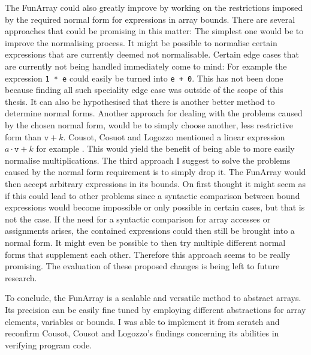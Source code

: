The FunArray could also greatly improve by working on the restrictions imposed by the required normal form for expressions in array bounds. There are several approaches that could be promising in this matter: The simplest one would be to improve the normalising process. It might be possible to normalise certain expressions that are currently deemed not normalisable. Certain edge cases that are currently not being handled immediately come to mind: For example the expression \texttt{1 * e} could easily be turned into \texttt{e + 0}. This has not been done because finding all such speciality edge case was outside of the scope of this thesis. It can also be hypothesised that there is another better method to determine normal forms. Another approach for dealing with the problems caused by the chosen normal form, would be to simply choose another, less restrictive form than $\texttt{v}+k$. Cousot, Cosuot and Logozzo mentioned a linear expression $a\cdot\texttt{v}+k$ for example \cite{cousot2011}. This would yield the benefit of being able to more easily normalise multiplications. The third approach I suggest to solve the problems caused by the normal form requirement is to simply drop it. The FunArray would then accept arbitrary expressions in its bounds. On first thought it might seem as if this could lead to other problems since a syntactic comparison between bound expressions would become impossible or only possible in certain cases, but that is not the case. If the need for a syntactic comparison for array accesses or assignments arises, the contained expressions could then still be brought into a normal form. It might even be possible to then try multiple different normal forms that supplement each other. Therefore this approach seems to be really promising. The evaluation of these proposed changes is being left to future research.

To conclude, the FunArray is a scalable and versatile method to abstract arrays. Its precision can be easily fine tuned by employing different abstractions for array elements, variables or bounds. I was able to implement it from scratch and reconfirm Cousot, Cousot and Logozzo's findings concerning its abilities in verifying program code.